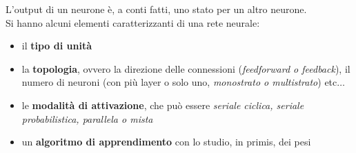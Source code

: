 \documentclass[a4paper,12pt, oneside]{book}
\begin{document}
L'output di un neurone è, a conti fatti, uno stato per un altro neurone.\\
Si hanno alcuni elementi caratterizzanti di una rete neurale:
\begin{itemize}
  \item il \textbf{tipo di unità}
  \item la \textbf{topologia}, ovvero la direzione delle connessioni
  (\textit{feedforward \textnormal{o} feedback}), il numero di neuroni (con più
  layer o solo uno, \textit{monostrato \textnormal{o} multistrato}) etc$\ldots$
  \item le \textbf{modalità di attivazione}, che può essere \textit{seriale
    ciclica, seriale probabilistica, parallela \textnormal{o} mista}
  \item un \textbf{algoritmo di apprendimento} con lo studio, in primis, dei
  pesi
\end{itemize}
\newpage
\end{document}
